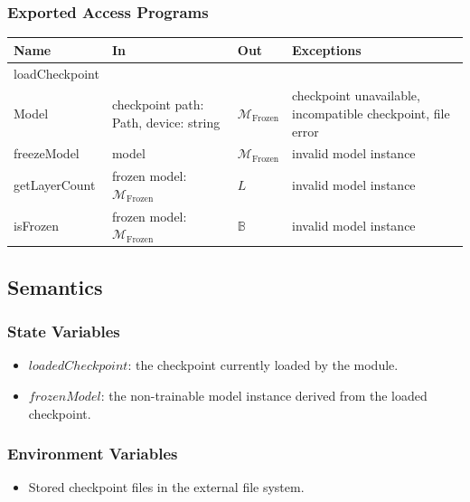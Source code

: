 \documentclass[12pt, titlepage]{article}
\begin{document}
\subsubsection{Exported Access Programs}

\begin{center}
\begin{tabular}{p{3.6cm} p{4.8cm} p{3.8cm} p{3.0cm}}
\hline
\textbf{Name} & \textbf{In} & \textbf{Out} & \textbf{Exceptions} \\
\hline
loadCheckpoint\\Model &
checkpoint path: Path, device: string &
$\mathcal{M}_{\mathrm{Frozen}}$ &
checkpoint unavailable, incompatible checkpoint, file error \\

freezeModel &
model &
$\mathcal{M}_{\mathrm{Frozen}}$ &
invalid model instance \\

getLayerCount &
frozen model: $\mathcal{M}_{\mathrm{Frozen}}$ &
$L$ &
invalid model instance \\

isFrozen &
frozen model: $\mathcal{M}_{\mathrm{Frozen}}$ &
$\mathbb{B}$ &
invalid model instance \\
\hline
\end{tabular}
\end{center}

\subsection{Semantics}

\subsubsection{State Variables}

\begin{itemize}
    \item $loadedCheckpoint$: the checkpoint currently loaded by the module.
    \item $frozenModel$: the non-trainable model instance derived from the loaded checkpoint.
\end{itemize}

\subsubsection{Environment Variables}

\begin{itemize}
    \item Stored checkpoint files in the external file system.
\end{itemize}
\end{document}
